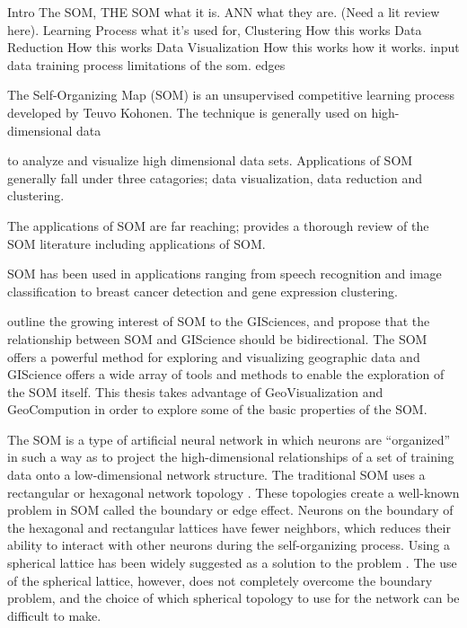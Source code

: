 Intro The SOM, 
	THE SOM
		what it is.
			ANN
				what they are. (Need a lit review here).
			Learning Process
		what it's used for, 
			Clustering
				How this works
			Data Reduction
				How this works
			Data Visualization
				How this works
		how it works.
			input data
			training process
		limitations of the som.
			edges
		

The Self-Organizing Map (SOM) is an unsupervised competitive learning process
developed by Teuvo Kohonen.
The technique is generally used on high-dimensional data

to analyze and visualize high dimensional data sets.  
Applications of SOM generally fall under three catagories; data visualization, data reduction and clustering.  



The applications of SOM are far reaching; \cite{Kohonen2000} provides a thorough review of the SOM literature including applications of SOM.  

SOM has been used in applications ranging from speech recognition and image classification to breast cancer detection and gene expression clustering.  

\cite{skupin08} outline the growing interest of SOM to
the GISciences, and propose that the relationship between SOM and GIScience
should be bidirectional.  The SOM offers a powerful method for exploring and
visualizing geographic data and GIScience offers a wide array of tools
and methods to enable the exploration of the SOM itself.  This thesis takes
advantage of GeoVisualization and GeoCompution in order to explore some of the basic
properties of the SOM.

The SOM is a type of artificial neural network in which neurons are ``organized''
in such a way as to project the high-dimensional relationships of a set of
training data onto a low-dimensional network structure.  The traditional
SOM uses a rectangular or hexagonal network topology \citep{Kohonen2000}.  These topologies 
create a well-known problem in SOM called the boundary or edge effect.  Neurons on
the boundary of the hexagonal and rectangular lattices have fewer neighbors,
which reduces their ability to interact with other neurons during the
self-organizing process.  Using a spherical lattice has been widely suggested as a
solution to the problem \citep{ritter99, boudjemai2003, sangole03,
Nishio:2006fk, wu2006}. The use of the spherical lattice, however, does not
completely overcome the boundary problem, and the choice of which spherical
topology to use for the network can be difficult to make.

